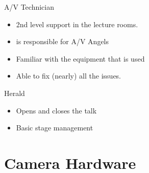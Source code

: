 \documentclass[aspectratio=169]{beamer}
\begin{document}
\begin{frame}{A/V Technician}
	\begin{itemize}
		\item 2nd level support in the lecture rooms. 
		\item is responsible for A/V Angels
		\item Familiar with the equipment that is used 
		\item Able to fix (nearly) all the issues. 
	\end{itemize}
\end{frame}


\begin{frame}{Herald}
\begin{itemize}
	\item Opens and closes the talk
	\item Basic stage management
\end{itemize}
\end{frame}




\section{Camera Hardware}
\end{document}
